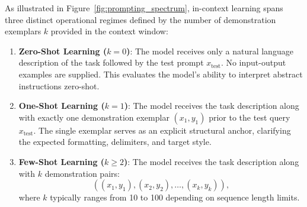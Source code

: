 \documentclass[../../main.tex]{subfiles}
\begin{document}
As illustrated in Figure~\ref{fig:prompting_spectrum}, in-context learning spans three distinct operational regimes defined by the number of demonstration exemplars $k$ provided in the context window:
\begin{enumerate}
    \item \textbf{Zero-Shot Learning ($k = 0$)}: The model receives only a natural language description of the task followed by the test prompt $x_{\text{test}}$. No input-output examples are supplied. This evaluates the model's ability to interpret abstract instructions zero-shot.
    
    \item \textbf{One-Shot Learning ($k = 1$)}: The model receives the task description along with exactly one demonstration exemplar $(x_1, y_1)$ prior to the test query $x_{\text{test}}$. The single exemplar serves as an explicit structural anchor, clarifying the expected formatting, delimiters, and target style.
    
    \item \textbf{Few-Shot Learning ($k \ge 2$)}: The model receives the task description along with $k$ demonstration pairs:
    \begin{equation*}
    ((x_1, y_1), (x_2, y_2), \dots, (x_k, y_k)),
    \end{equation*}
    where $k$ typically ranges from 10 to 100 depending on sequence length limits.
\end{enumerate}
\end{document}
